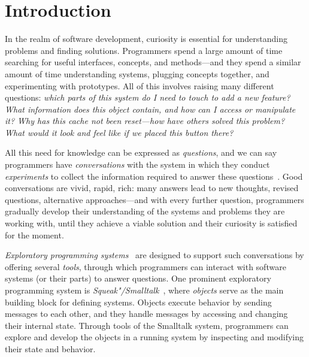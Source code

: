 

\chapter{Introduction}
\label{cha:introduction}

In the realm of software development, curiosity is essential for understanding problems and finding solutions.
Programmers spend a large amount of time searching for useful interfaces, concepts, and methods---and they spend a similar amount of time understanding systems, plugging concepts together, and experimenting with prototypes.
All of this involves raising many different questions:
\emph{%
	which parts of this system do I need to touch to add a new feature?
	What information does this object contain, and how can I access or manipulate it?
	Why has this cache not been reset---how have others solved this problem?
	What would it look and feel like if we placed this button there?
}

All this need for knowledge can be expressed as \emph{questions}, and we can say programmers have \emph{conversations} with the system in which they conduct \emph{experiments} to collect the information required to answer these questions~\cite{taeumel2022pattern}.
Good conversations are vivid, rapid, rich: many answers lead to new thoughts, revised questions, alternative approaches---and with every further question, programmers gradually develop their understanding of the systems and problems they are working with, until they achieve a viable solution and their curiosity is satisfied for the moment.

\emph{Exploratory programming systems}~\cite{sandberg1988smalltalk,rein2018exploratory} are designed to support such conversations by offering several \emph{tools}, through which programmers can interact with software systems (or their parts) to answer questions.
One prominent exploratory programming system is \emph{Squeak"/Smalltalk}~\cite{goldberg1983smalltalk,thiede2023squeak}, where \emph{objects} serve as the main building block for defining systems. %
Objects execute behavior by sending messages to each other, and they handle messages by accessing and changing their internal state.
Through tools of the Smalltalk system, programmers can explore and develop the objects in a running system by inspecting and modifying their state and behavior.

